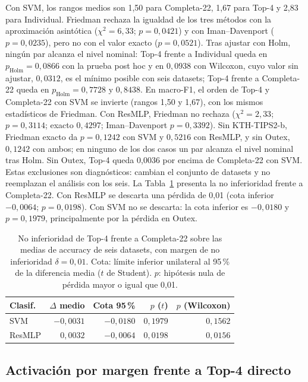 \documentclass[a4paper,fleqn]{cas-sc}
\begin{document}
Con SVM, los rangos medios son 1,50 para Completa-22, 1,67 para Top-4 y 2,83 para Individual. Friedman rechaza la igualdad de los tres métodos con la aproximación asintótica ($\chi^2=6{,}33$; $p=0{,}0421$) y con Iman--Davenport ($p=0{,}0235$), pero no con el valor exacto ($p=0{,}0521$). Tras ajustar con Holm, ningún par alcanza el nivel nominal: Top-4 frente a Individual queda en $p_{\mathrm{Holm}}=0{,}0866$ con la prueba post hoc y en $0{,}0938$ con Wilcoxon, cuyo valor sin ajustar, $0{,}0312$, es el mínimo posible con seis datasets; Top-4 frente a Completa-22 queda en $p_{\mathrm{Holm}}=0{,}7728$ y $0{,}8438$. En macro-F1, el orden de Top-4 y Completa-22 con SVM se invierte (rangos 1,50 y 1,67), con los mismos estadísticos de Friedman. Con ResMLP, Friedman no rechaza ($\chi^2=2{,}33$; $p=0{,}3114$; exacto $0{,}4297$; Iman--Davenport $p=0{,}3392$). Sin KTH-TIPS2-b, Friedman exacto da $p=0{,}1242$ con SVM y $0{,}5216$ con ResMLP, y sin Outex, $0{,}1242$ con ambos; en ninguno de los dos casos un par alcanza el nivel nominal tras Holm. Sin Outex, Top-4 queda 0,0036 por encima de Completa-22 con SVM. Estas exclusiones son diagnósticos: cambian el conjunto de datasets y no reemplazan el análisis con los seis. La Tabla~\ref{tab:no-inferioridad} presenta la no inferioridad frente a Completa-22. Con ResMLP se descarta una pérdida de 0,01 (cota inferior $-0{,}0064$; $p=0{,}0198$). Con SVM no se descarta: la cota inferior es $-0{,}0180$ y $p=0{,}1979$, principalmente por la pérdida en Outex.

\begin{table}[pos=htbp]
\centering
\caption{No inferioridad de Top-4 frente a Completa-22 sobre las medias de accuracy de seis datasets, con margen de no inferioridad $\delta=0{,}01$. Cota: límite inferior unilateral al 95\,\% de la diferencia media ($t$ de Student). $p$: hipótesis nula de pérdida mayor o igual que 0,01.}
\label{tab:no-inferioridad}
\small
\begin{tabular}{@{}lrrrr@{}}
\toprule
Clasif. & $\Delta$ medio & Cota 95\,\% & $p$ ($t$) & $p$ (Wilcoxon) \\
\midrule
SVM & $-0{,}0031$ & $-0{,}0180$ & $0{,}1979$ & $0{,}1562$ \\
ResMLP & $0{,}0032$ & $-0{,}0064$ & $0{,}0198$ & $0{,}0156$ \\
\bottomrule
\end{tabular}
\end{table}
\FloatBarrier

\subsection{Activación por margen frente a Top-4 directo}\label{sec:resultados-margen}
\end{document}

